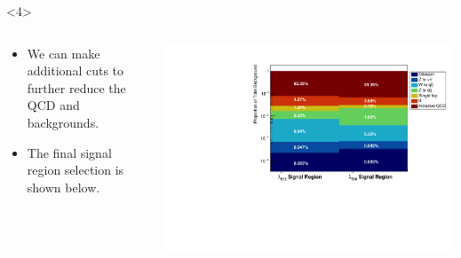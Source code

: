 \documentclass[]{beamer}
\begin{document}
\begin{frame}
  \begin{onlyenv}<4>
    \begin{columns}
      \begin{column}{0.5\textwidth}
        \begin{itemize}
        \item We can make additional cuts to further reduce the QCD and \quarkt\aquarkt{} backgrounds. 
        \item The final signal region selection is shown below. 
        \end{itemize}
      \end{column}
      \begin{column}{0.5\textwidth}
        \includegraphics[width=\textwidth]{figures/backgroundStack.pdf}
      \end{column}
    \end{columns}


\end{onlyenv}
\end{frame}
\end{document}
